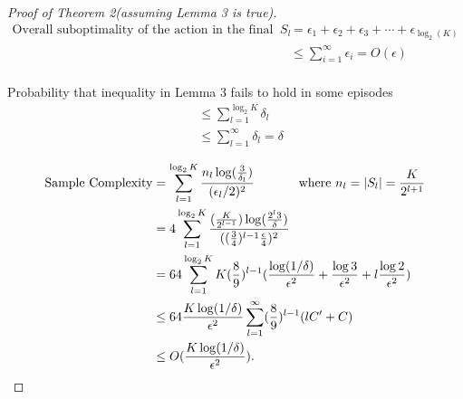 \documentclass[11pt]{article}
\begin{document}
\begin{proof}[Proof of Theorem 2(assuming Lemma 3 is true)] 
	\begin{align*}
		\text{Overall suboptimality of the action in the final set $S_l$}
		&= \epsilon_1 + \epsilon_2 + \epsilon_3 + \cdots + \epsilon_{\log_2(K)} \\
		& \leq \sum_{i = 1}^{\infty} \epsilon_i = O(\epsilon) \\
	\end{align*}
	
	Probability that inequality in Lemma 3 fails to hold in some episodes
	\begin{align*}
		& \leq \sum_{l = 1}^{\log_2{K}}\delta_l  \\
		& \leq \sum_{l = 1}^{\infty}\delta_l  = \delta
	\end{align*}
	
	\begin{align*}
		\text{Sample Complexity} &= \sum_{l = 1}^{\log_2{K}}\frac{n_l \log(\frac{3}{\delta_l})}{(\epsilon_l/2)^2} 
		\text{ \hspace{1cm} where } n_l = |S_l| = \frac{K}{2^{l+1}} \\
		& = 4\sum_{l = 1}^{\log_2{K}} \frac{  (\frac{K}{2^{l-1}})\log(\frac{2^l3}{\delta})}{((\frac{3}{4})^{l-1}\frac{\epsilon}{4})^2}\\
		&= 64\sum_{l=1}^{\log_2{K}} K(\frac{8}{9})^{l-1}(\frac{\log(1/\delta)}{\epsilon^2}+\frac{\log{3}}{\epsilon^2}+l\frac{\log{2}}{\epsilon^2})\\
		& \leq 64 \frac{K\log(1/\delta)}{\epsilon^2} \sum_{l=1}^{\infty} (\frac{8}{9})^{l-1} (lC' + C)\\
		& \leq O(\frac{K\log(1/\delta)}{\epsilon^2}).
	\end{align*}
\end{proof}


\end{document}
